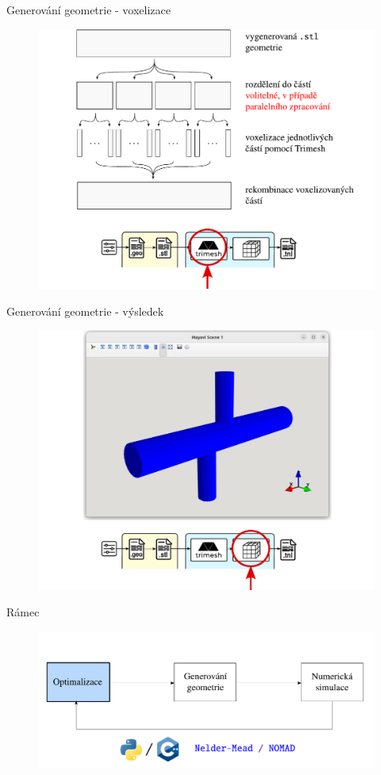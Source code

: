 \documentclass[aspectratio=169,xcolor=dvipsnames]{beamer}
\begin{document}
\begin{frame}{Generování geometrie - voxelizace}
	\begin{figure}
		\includegraphics[width=0.6\linewidth, trim={0 -0.1cm 0 0}, clip]{Images/meshgen-3.pdf}
	\end{figure}
\end{frame}
\begin{frame}{Generování geometrie - výsledek}
	\begin{figure}
		\includegraphics[width=0.6\linewidth, trim={0 -0.1cm 0 0}, clip]{Images/meshgen-4.pdf}
	\end{figure}
\end{frame}
\begin{frame}{Rámec}
	\addtocounter{framenumber}{-1}
	\begin{figure}
		\includegraphics[width=0.95\linewidth, trim={0 -0.1cm 0 0}, clip]{Images/framework-cz-3.pdf}
	\end{figure}
\end{frame}
\end{document}
